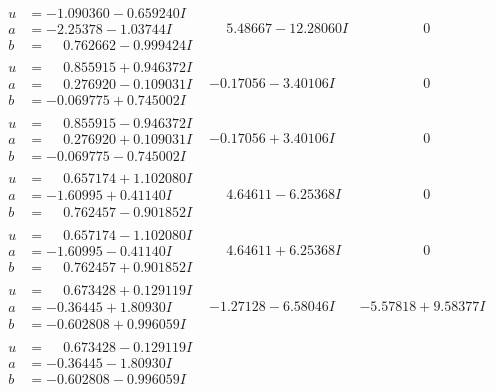 \documentclass[1p]{elsarticle_modified}
\theoremstyle{definition}
\begin{document}
$$\begin{array}{c|c|c}
\begin{aligned}
u &= -1.090360 - 0.659240 I \\
a &= -2.25378 - 1.03744 I \\
b &= \phantom{-}0.762662 - 0.999424 I\end{aligned}
 & \phantom{-}5.48667 - 12.28060 I & \phantom{-0.000000 } 0 \\ \hline\begin{aligned}
u &= \phantom{-}0.855915 + 0.946372 I \\
a &= \phantom{-}0.276920 - 0.109031 I \\
b &= -0.069775 + 0.745002 I\end{aligned}
 & -0.17056 - 3.40106 I & \phantom{-0.000000 } 0 \\ \hline\begin{aligned}
u &= \phantom{-}0.855915 - 0.946372 I \\
a &= \phantom{-}0.276920 + 0.109031 I \\
b &= -0.069775 - 0.745002 I\end{aligned}
 & -0.17056 + 3.40106 I & \phantom{-0.000000 } 0 \\ \hline\begin{aligned}
u &= \phantom{-}0.657174 + 1.102080 I \\
a &= -1.60995 + 0.41140 I \\
b &= \phantom{-}0.762457 - 0.901852 I\end{aligned}
 & \phantom{-}4.64611 - 6.25368 I & \phantom{-0.000000 } 0 \\ \hline\begin{aligned}
u &= \phantom{-}0.657174 - 1.102080 I \\
a &= -1.60995 - 0.41140 I \\
b &= \phantom{-}0.762457 + 0.901852 I\end{aligned}
 & \phantom{-}4.64611 + 6.25368 I & \phantom{-0.000000 } 0 \\ \hline\begin{aligned}
u &= \phantom{-}0.673428 + 0.129119 I \\
a &= -0.36445 + 1.80930 I \\
b &= -0.602808 + 0.996059 I\end{aligned}
 & -1.27128 - 6.58046 I & -5.57818 + 9.58377 I \\ \hline\begin{aligned}
u &= \phantom{-}0.673428 - 0.129119 I \\
a &= -0.36445 - 1.80930 I \\
b &= -0.602808 - 0.996059 I\end{aligned}

\end{array}$$
\end{document}

